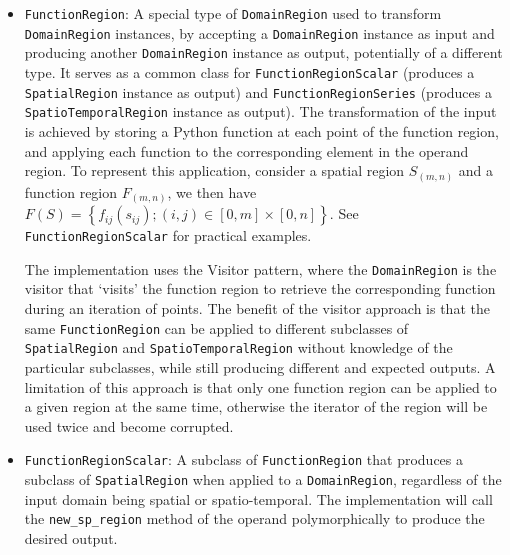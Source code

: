 \begin{itemize}
	\item \texttt{FunctionRegion}:
	A special type of \texttt{DomainRegion} used to transform \texttt{DomainRegion} instances, by accepting a \texttt{DomainRegion} instance as input and producing another \texttt{DomainRegion} instance as output, potentially of a different type. It serves as a common class for \texttt{FunctionRegionScalar} (produces a \texttt{SpatialRegion} instance as output) and \texttt{FunctionRegionSeries} (produces a \texttt{SpatioTemporalRegion} instance as output). The transformation of the input is achieved by storing a Python function at each point of the function region, and applying each function to the corresponding element in the operand region. To represent this application, consider a spatial region $S_{(m,n)}$ and a function region $F_{(m,n)}$, we then have $F(S) = \left\{ f_{ij}(s_{ij}); (i, j) \in [0, m]\times[0, n] \right\}$. See \texttt{FunctionRegionScalar} for practical examples.

	The implementation uses the Visitor pattern, where the \texttt{DomainRegion} is the visitor that `visits' the function region to retrieve the corresponding function during an iteration of points. The benefit of the visitor approach is that the same \texttt{FunctionRegion} can be applied to different subclasses of \texttt{SpatialRegion} and \texttt{SpatioTemporalRegion} without knowledge of the particular subclasses, while still producing different and expected outputs. A limitation of this approach is that only one function region can be applied to a given region at the same time, otherwise the iterator of the region will be used twice and become corrupted.
	
	
	\item \texttt{FunctionRegionScalar}: A subclass of \texttt{FunctionRegion} that produces a subclass of \texttt{SpatialRegion} when applied to a \texttt{DomainRegion}, regardless of the input domain being spatial or spatio-temporal. The implementation will call the \texttt{new\_sp\_region} method of the operand polymorphically to produce the desired output.
	

\end{itemize}

